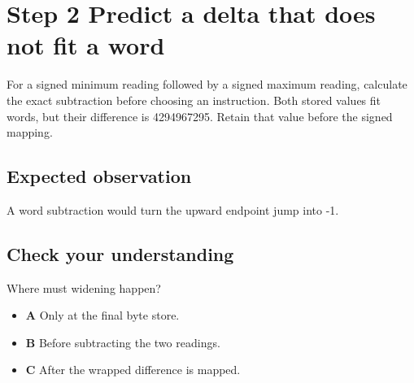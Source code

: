 \section{Step 2 Predict a delta that does not fit a word}\label{delta-s02}

For a signed minimum reading followed by a signed maximum reading, calculate the exact subtraction before choosing an instruction. Both stored values fit words, but their difference is 4294967295. Retain that value before the signed mapping.

\subsection{Expected observation}
A word subtraction would turn the upward endpoint jump into -1.

\subsection{Check your understanding}
Where must widening happen?

\begin{itemize}
  \item \textbf{A} Only at the final byte store.
  \item \textbf{B} Before subtracting the two readings.
  \item \textbf{C} After the wrapped difference is mapped.
\end{itemize}
